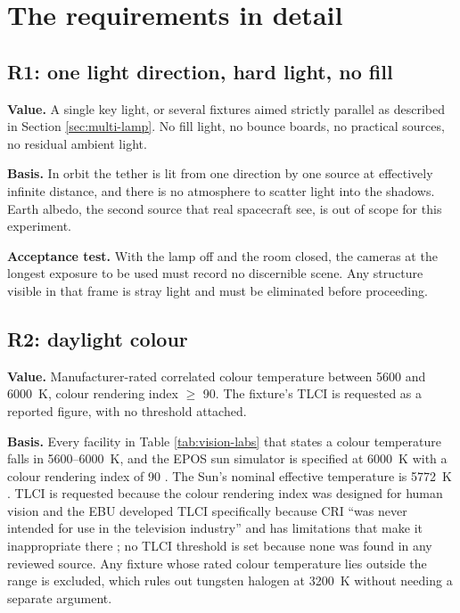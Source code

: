 \section{The requirements in detail}

\subsection{R1: one light direction, hard light, no fill}
\label{sec:r1}

\textbf{Value.} A single key light, or several fixtures aimed strictly parallel as described in Section \ref{sec:multi-lamp}. No fill light, no bounce boards, no practical sources, no residual ambient light.

\textbf{Basis.} In orbit the tether is lit from one direction by one source at effectively infinite distance, and there is no atmosphere to scatter light into the shadows. Earth albedo, the second source that real spacecraft see, is out of scope for this experiment.

\textbf{Acceptance test.} With the lamp off and the room closed, the cameras at the longest exposure to be used must record no discernible scene. Any structure visible in that frame is stray light and must be eliminated before proceeding.

\subsection{R2: daylight colour}
\label{sec:r2}

\textbf{Value.} Manufacturer-rated correlated colour temperature between 5600 and 6000~K, colour rendering index $\geq$ 90. The fixture's TLCI is requested as a reported figure, with no threshold attached.

\textbf{Basis.} Every facility in Table \ref{tab:vision-labs} that states a colour temperature falls in 5600--6000~K, and the EPOS sun simulator is specified at 6000~K with a colour rendering index of 90 \cite{dlr2025eposportfolio}. The Sun's nominal effective temperature is 5772~K \cite{prsa2016iau}. TLCI is requested because the colour rendering index was designed for human vision and the EBU developed TLCI specifically because CRI ``was never intended for use in the television industry'' and has limitations that make it inappropriate there \cite{ebu_tech3355}; no TLCI threshold is set because none was found in any reviewed source. Any fixture whose rated colour temperature lies outside the range is excluded, which rules out tungsten halogen at 3200~K without needing a separate argument.

